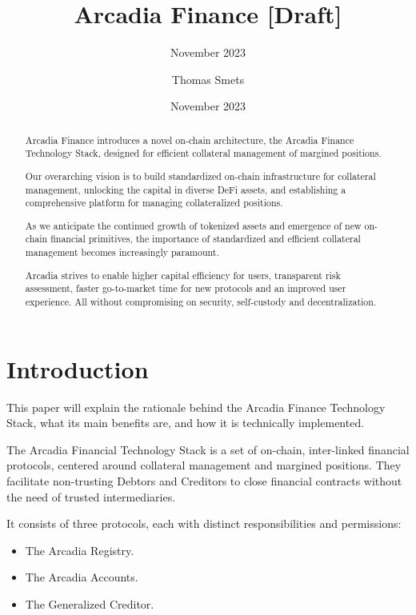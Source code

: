 \documentclass[sigconf,nonacm]{acmart}
\title{Arcadia Finance [Draft]}
\subtitle{November 2023}
\date{November 2023}
\author{Thomas Smets}
\affiliation{
    \institution{Arcadia Finance}
    \city{Brussels}
    \country{Belgium}
}
\begin{document}
\begin{abstract}
    Arcadia Finance introduces a novel on-chain architecture, the Arcadia Finance Technology Stack,
    designed for efficient collateral management of margined positions.

    Our overarching vision is to build standardized on-chain infrastructure for collateral management,
    unlocking the capital in diverse DeFi assets, and establishing a comprehensive platform for managing collateralized positions. 

    As we anticipate the continued growth of tokenized assets and emergence of new on-chain financial primitives, 
    the importance of standardized and efficient collateral management becomes increasingly paramount.

    Arcadia strives to enable higher capital efficiency for users, transparent risk assessment,
    faster go-to-market time for new protocols and an improved user experience.
    All without compromising on security, self-custody and decentralization.
\end{abstract}


\maketitle

\section{Introduction} 
\label{sec:introduction}
This paper will explain the rationale behind the Arcadia Finance Technology Stack, what its main benefits are,
and how it is technically implemented.

The Arcadia Financial Technology Stack is a set of on-chain, inter-linked financial protocols,
centered around collateral management and margined positions.
They facilitate non-trusting Debtors and Creditors to close financial contracts without the need of trusted intermediaries.

It consists of three protocols, each with distinct responsibilities and permissions:
\begin{itemize}
\item The Arcadia Registry.
\item The Arcadia Accounts.
\item The Generalized Creditor.
\end{itemize}
\end{document}

